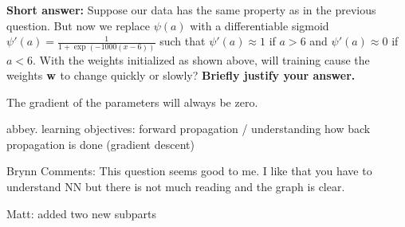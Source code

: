 \begin{parts}
\begin{subparts}
\subpart[2] \textbf{Short answer:} Suppose our data has the same property as in the previous question. But now we replace $\psi(a)$ with a differentiable sigmoid $\psi'(a) = \frac{1}{1 + \exp(-1000(x-6))}$ such that $\psi'(a) \approx 1$ if $a > 6$ and $\psi'(a) \approx 0$ if $a < 6$. 
%
With the weights initialized as shown above, will training cause the weights $\mathbf{w}$ to change quickly or slowly? \textbf{Briefly justify your answer.}
\fillwithlines{6em}
    \begin{soln}
        The gradient of the parameters will always be zero.
    \end{soln} 

\end{subparts}
\begin{qauthor}
   abbey. learning objectives: forward propagation / understanding how back propagation is done (gradient descent)
   
   Brynn Comments: This question seems good to me. I like that you have to understand NN but there is not much reading and the graph is clear.
   
   Matt: added two new subparts
\end{qauthor}



\begin{comment}
\part Consider the following dataset consisting of 6 data points in 2D space:


\end{comment}
\end{parts}
